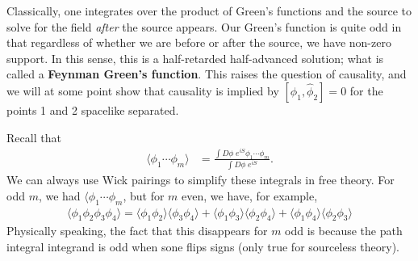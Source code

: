 \documentclass{../mathnotes}
\begin{document}
Classically, one integrates over the product of Green's functions and the source to solve for the field \textit{after} the source appears.
Our Green's function is quite odd in that regardless of whether we are before or after the source, we have non-zero support. In this sense,
this is a half-retarded half-advanced solution; what is called a \textbf{Feynman Green's function}. This raises the question of causality, and we
will at some point show that causality is implied by $[\hat{\phi}_1,\hat{\phi}_2]=0$ for the points 1 and 2 spacelike separated.

Recall that 
\begin{align*}
    \langle \phi_1 \cdots \phi_m\rangle&=\frac{\int D\phi\;e^{iS}\phi_1\cdots\phi_m}{\int D\phi\;e^{iS}}.
\end{align*}
We can always use Wick pairings to simplify these integrals in free theory. For odd $m$, we had $\langle \phi_1\cdots\phi_m$, but for $m$ even,
we have, for example,
\begin{align*}
    \langle \phi_1\phi_2\phi_3\phi_4 \rangle=\langle\phi_1\phi_2\rangle\langle\phi_3\phi_4\rangle+\langle\phi_1\phi_3\rangle\langle\phi_2\phi_4\rangle+\langle\phi_1\phi_4\rangle\langle\phi_2\phi_3\rangle
\end{align*}
Physically speaking, the fact that this disappears for $m$ odd is because the path integral integrand is odd when sone flips signs (only true for
sourceless theory).
\end{document}
